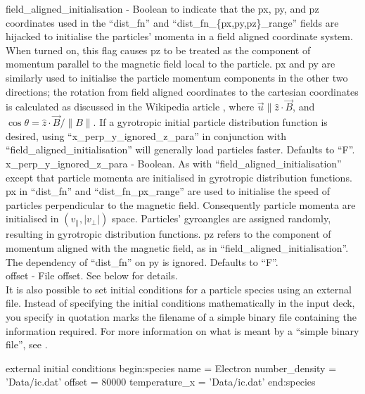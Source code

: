 {\emphtext field\_aligned\_initialisation} - Boolean to indicate that the
px, py, and pz coordinates used in the ``dist\_fn'' and
``dist\_fn\_\{px,py,pz\}\_range'' fields are hijacked to initialise the
particles' momenta in a field aligned coordinate system.
When turned on, this flag causes pz to be treated as the component of
momentum parallel to the magnetic field local to the particle.
px and py are similarly used to initialise the particle momentum
components in the other two directions; the rotation from field
aligned coordinates to the cartesian coordinates is calculated as discussed in
the Wikipedia article \cite{rotmatrix},
where ${\vec u \parallel {\hat z} \cdot {\vec B}}$, and
$\cos\theta = {{\hat z}\cdot{\vec B}} / {\|B\|}$.
If a gyrotropic initial particle distribution function is desired, using
``x\_perp\_y\_ignored\_z\_para'' in conjunction with
``field\_aligned\_initialisation'' will generally load particles faster.
Defaults to ``F''. \\

{\emphtext x\_perp\_y\_ignored\_z\_para} -
Boolean. As with ``field\_aligned\_initialisation'' except that particle momenta
are initialised in gyrotropic distribution functions. px in ``dist\_fn'' and
``dist\_fn\_px\_range'' are used to initialise the speed of particles
perpendicular to the magnetic field. Consequently particle momenta are
initialised in $(v_\parallel, |v_\bot|)$ space.
Particles' gyroangles are assigned randomly, resulting in gyrotropic
distribution functions.
pz refers to the component of momentum aligned with the magnetic field, as
in ``field\_aligned\_initialisation''.
The dependency of ``dist\_fn'' on py is ignored.
Defaults to ``F''.\\

{\emphtext offset} - File offset. See below for details.\\


It is also possible to set initial conditions for a particle species
using an external file.  Instead of specifying the
initial conditions mathematically in the input deck, you specify in quotation
marks the filename of a simple binary file containing the information required.
For more information on what is meant by a ``simple binary file'', see
.
\begin{lboxverbatim}{external initial conditions}
begin:species
   name = Electron
   number_density = 'Data/ic.dat'
   offset = 80000
   temperature_x = 'Data/ic.dat'
end:species
\end{lboxverbatim}

